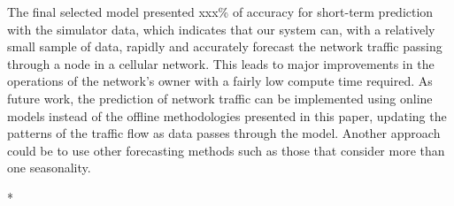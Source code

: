 \documentclass[conference]{IEEEtran}
\begin{document}
The final selected model presented xxx\% of accuracy for short-term prediction with the simulator data, which indicates that our system can, with a relatively small sample of data, rapidly and accurately forecast the network traffic passing through a node in a cellular network. This leads to major improvements in the operations of the network’s owner with a fairly low compute time required. As future work, the prediction of network traffic can be implemented using online models instead of the offline methodologies presented in this paper, updating the patterns of the traffic flow as data passes through the model. Another approach could be to use other forecasting methods such as those that consider more than one seasonality.

*
\end{document}
